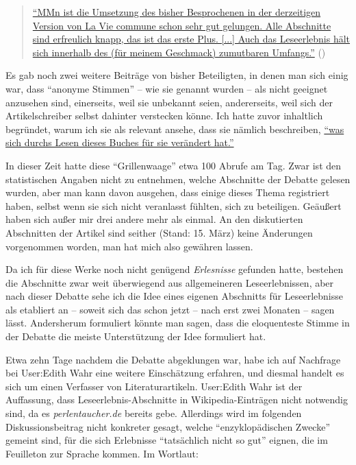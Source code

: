 \documentclass[fontsize=12pt]{scrartcl}
\begin{document}
\singlespacing
\begin{quote}
\href{https://de.wikipedia.org/w/index.php?title=Benutzer_Diskussion:Grillenwaage\&diff=next\&oldid=138067900}{"`MMn ist die Umsetzung des bis\-her Besprochenen in der derzeitigen Version von La Vie commune schon sehr gut gelungen. Alle Abschnitte sind erfreulich knapp, das ist das erste Plus. [...] Auch das \flq Leseerlebnis\frq \,\,h\"alt sich innerhalb des (f\"ur meinem Geschmack) zumutbaren Umfangs."'} (\cite{UserEpipactis2015d})
\end{quote}
\onehalfspacing

Es gab noch zwei weitere Beitr\"age von bis\-her Beteiligten, in denen man sich einig war, dass "`anonyme Stimmen"' -- wie sie genannt wurden -- als nicht ge\-eig\-net anzusehen sind, einerseits, weil sie unbekannt seien, an\-de\-rerseits, weil sich der Ar\-ti\-kel\-schrei\-ber\textsuperscript{\tiny *} \mbox{selbst} dahinter verstecken k\"onne. Ich hatte zuvor inhaltlich begr\"undet, warum ich sie als relevant ansehe, dass sie n\"amlich beschrei\-ben,
\href{https://de.wikipedia.org/w/index.php?title=Benutzer_Diskussion:Grillenwaage\&type=revision\&diff=138095833\&oldid=138073134}{"`was sich durchs Lesen dieses Buches f\"ur sie ver\"andert hat."'}

In dieser Zeit hatte diese "`Grillenwaage"' etwa 100 Abrufe am Tag. Zwar ist den statistischen Angaben nicht zu entnehmen, welche Abschnitte der Debatte gelesen wurden, aber man kann davon ausgehen, dass einige dieses Thema registriert haben, \mbox{selbst} wenn sie sich nicht veranlasst f\"uhlten, sich zu beteiligen. Ge\"au{\ss}ert haben sich au{\ss}er mir drei andere mehr als einmal. An den diskutierten Abschnitten der Artikel sind seither (Stand: 15. M\"arz) keine \"Anderungen vorgenommen worden, man hat mich also gew\"ahren lassen. 

Da ich f\"ur diese Werke noch nicht gen\"ugend \textit{Erlesnisse} gefunden hatte, bestehen die Abschnitte zwar weit \"uberwiegend aus allgemeineren Leseerlebnissen, aber nach dieser Debatte sehe ich die Idee eines eigenen Abschnitts f\"ur Leseerlebnisse als etabliert an -- soweit sich das schon jetzt -- nach erst zwei Monaten -- sagen l\"asst. Andersherum formuliert k\"onnte man sagen, dass die eloquenteste Stimme in der Debatte die meiste Unterst\"utzung der Idee formuliert hat.

Etwa zehn Tage nachdem die Debatte abgeklungen war, habe ich auf Nachfrage bei \mbox{User}:Edith Wahr eine weitere Einsch\"atzung erfahren, und diesmal handelt es sich um einen Verfasser\textsuperscript{\tiny *} von Li\-te\-ra\-tur\-artikeln. \mbox{User}:Edith Wahr ist der Auffassung, dass Leseerleb\-nis-Abschnitte in Wi\-ki\-pe\-dia-Eintr\"agen nicht notwendig sind, da es \textit{per\-len\-tau\-cher.de} bereits gebe. Al\-ler\-dings wird im folgenden Dis\-kus\-si\-onsbeitrag nicht konkreter gesagt, welche "`\flq enzy\-klop\"a\-di\-schen\frq \,\,Zwecke"' gemeint sind, f\"ur die sich Erlebnisse "`tats\"achlich nicht so gut"' eignen, die im Feuilleton zur Sprache kommen. Im Wortlaut: 
\end{document}
